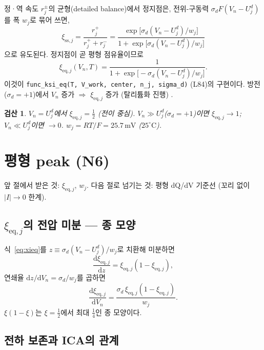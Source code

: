 \documentclass[11pt,a4paper]{article}
\newtheorem*{verifybox}{검산}
\newcommand{\dd}{\mathrm{d}}
\newcommand{\eq}{\mathrm{eq}}
\newcommand{\sstat}{\mathrm{ss}}
\begin{document}
정·역 속도 $r_j^\pm$의 균형(detailed balance)에서 정지점은, 전위-구동력
$\sigma_d F(V_n - U_j^d)$를 폭 $w_j$로 묶어 쓰면,
\begin{equation}
  \xi_{\sstat,j} = \frac{r_j^+}{r_j^+ + r_j^-}
  = \frac{\exp\!\bigl[\sigma_d(V_n-U_j^d)/w_j\bigr]}{1+\exp\!\bigl[\sigma_d(V_n-U_j^d)/w_j\bigr]}
  \label{eq:stationary}
\end{equation}
으로 유도된다. 정지점이 곧 평형 점유율이므로
\begin{equation}
  \boxed{\xi_{\eq,j}(V_n, T) = \frac{1}{1+\exp\!\big[-\sigma_d(V_n-U_j^d)/w_j\big]}.}
  \label{eq:xieq}
\end{equation}
이것이 \texttt{func\_ksi\_eq(T, V\_work, center, n\_j, sigma\_d)} (L84)의 구현이다.
방전($\sigma_d=+1$)에서 $V_n$ 증가 $\Rightarrow$ $\xi_{\eq,j}$ 증가
(탈리튬화 진행) \checkmark.

\begin{verifybox}
$V_n = U_j^d$에서 $\xi_{\eq,j} = \tfrac12$ (전이 중심).
$V_n \gg U_j^d$($\sigma_d=+1$)이면 $\xi_{\eq,j}\to1$; $V_n \ll U_j^d$이면 $\to0$.
$w_j = RT/F = 25.7\,\mathrm{mV}$ ($25^\circ\mathrm{C}$).
\end{verifybox}

\section{평형 peak (N6)}
\label{sec:eqpeak}
앞 절에서 받은 것: $\xi_{\eq,j}$, $w_j$.
다음 절로 넘기는 것: 평형 dQ/dV 기준선 (꼬리 없이 $|I|\to0$ 한계).

\subsection{$\xi_{\eq,j}$의 전압 미분 — 종 모양}

식~\eqref{eq:xieq}를 $z\equiv\sigma_d(V_n-U_j^d)/w_j$로 치환해 미분하면
\begin{equation}
  \frac{\dd\xi_{\eq,j}}{\dd z} = \xi_{\eq,j}(1-\xi_{\eq,j}),
\end{equation}
연쇄율 $\dd z/\dd V_n = \sigma_d/w_j$를 곱하면
\begin{equation}
  \frac{\dd\xi_{\eq,j}}{\dd V_n} = \frac{\sigma_d\,\xi_{\eq,j}(1-\xi_{\eq,j})}{w_j}.
  \label{eq:dxidV}
\end{equation}
$\xi(1-\xi)$는 $\xi=\tfrac12$에서 최대 $\tfrac14$인 종 모양이다.

\subsection{전하 보존과 ICA의 관계}
\end{document}
